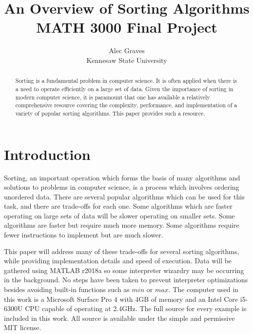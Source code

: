 \documentclass[a4paper]{article}
\title{An Overview of Sorting Algorithms\\MATH 3000 Final Project}
\author{Alec Graves\\Kennesaw State University}
\begin{document}

\maketitle

\begin{abstract}
Sorting is a fundamental problem in computer science. It is often applied when there is a need to operate efficiently on a large set of data. Given the importance of sorting in modern computer science, it is paramount that one has available a relatively comprehensive resource covering the complexity, performance, and implementation of a variety of popular sorting algorithms. This paper provides such a resource.\end{abstract}

\section{Introduction}

Sorting, an important operation which forms the basis of many algorithms and solutions to problems in computer science, is a process which involves ordering unordered data. There are several popular algorithms which can be used for this task, and there are trade-offs for each one. Some algorithms which are faster operating on large sets of data will be slower operating on smaller sets. Some algorithms are faster but require much more memory. Some algorithms require fewer instructions to implement but are much slower.

This paper will address many of these trade-offs for several sorting algorithms, while providing implementation details and speed of execution. Data will be gathered using MATLAB r2018a so some interpreter wizardry may be occurring in the background. No steps have been taken to prevent interpreter optimizations besides avoiding built-in functions such as $min$ or $max$. The computer used in this work is a Microsoft Surface Pro 4 with 4GB of memory and an Intel Core i5-6300U CPU capable of operating at 2.4GHz. The full source for every example is included in this work. All source is available under the simple and permissive MIT license.
 
\end{document}

